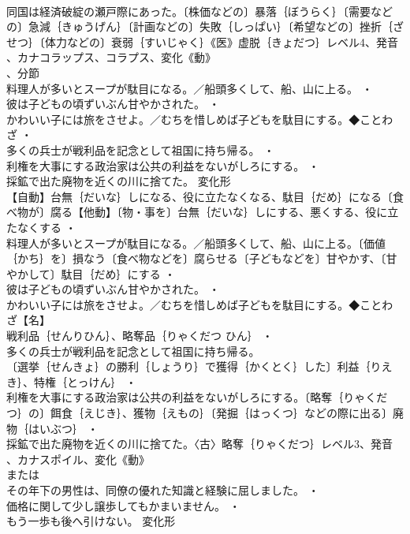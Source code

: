\documentclass[8pt]{extreport}
\begin{document}
\begin{CJK}{UTF8}{min}
\\	同国は経済破綻の瀬戸際にあった。〔株価などの〕暴落｛ぼうらく｝〔需要などの〕急減｛きゅうげん｝〔計画などの〕失敗｛しっぱい｝〔希望などの〕挫折｛ざせつ｝〔体力などの〕衰弱｛すいじゃく｝《医》虚脱｛きょだつ｝レベル4、発音
\\	、カナコラップス、コラプス、変化《動》
\\	、分節
\\	料理人が多いとスープが駄目になる。／船頭多くして、船、山に上る。 ・
\\	彼は子どもの頃ずいぶん甘やかされた。 ・
\\	かわいい子には旅をさせよ。／むちを惜しめば子どもを駄目にする。◆ことわざ ・
\\	多くの兵士が戦利品を記念として祖国に持ち帰る。 ・
\\	利権を大事にする政治家は公共の利益をないがしろにする。 ・
\\	採鉱で出た廃物を近くの川に捨てた。	変化形 
\\	【自動】台無｛だいな｝しになる、役に立たなくなる、駄目｛だめ｝になる〔食べ物が〕腐る【他動】〔物・事を〕台無｛だいな｝しにする、悪くする、役に立たなくする ・
\\	料理人が多いとスープが駄目になる。／船頭多くして、船、山に上る。〔価値｛かち｝を〕損なう〔食べ物などを〕腐らせる〔子どもなどを〕甘やかす、〔甘やかして〕駄目｛だめ｝にする ・
\\	彼は子どもの頃ずいぶん甘やかされた。 ・
\\	かわいい子には旅をさせよ。／むちを惜しめば子どもを駄目にする。◆ことわざ【名】
\\	戦利品｛せんりひん｝、略奪品｛りゃくだつ ひん｝ ・
\\	多くの兵士が戦利品を記念として祖国に持ち帰る。
\\	〔選挙｛せんきょ｝の勝利｛しょうり｝で獲得｛かくとく｝した〕利益｛りえき｝、特権｛とっけん｝ ・
\\	利権を大事にする政治家は公共の利益をないがしろにする。〔略奪｛りゃくだつ｝の〕餌食｛えじき｝、獲物｛えもの｝〔発掘｛はっくつ｝などの際に出る〕廃物｛はいぶつ｝ ・
\\	採鉱で出た廃物を近くの川に捨てた。〈古〉略奪｛りゃくだつ｝レベル3、発音
\\	、カナスポイル、変化《動》
\\	または
\\	その年下の男性は、同僚の優れた知識と経験に屈しました。 ・
\\	価格に関して少し譲歩してもかまいません。 ・
\\	もう一歩も後へ引けない。	変化形 

\end{CJK}
\end{document}
